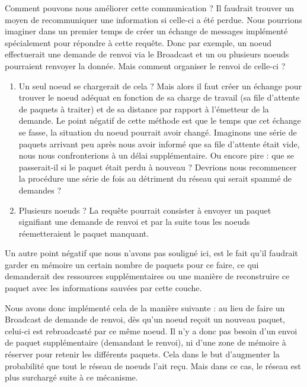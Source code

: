 \documentclass[journal, a4paper]{IEEEtran}
\begin{document}
        Comment pouvons nous améliorer cette communication ? Il faudrait trouver un moyen de recommuniquer une information si celle-ci a été perdue.
        Nous pourrions imaginer dans un premier temps de créer un échange de messages implémenté spécialement pour répondre à cette requête. Donc par exemple, un noeud 
        effectuerait une demande de renvoi via le Broadcast et un ou plusieurs noeuds pourraient renvoyer la donnée. Mais comment organiser le renvoi de celle-ci ?
        \begin{enumerate}
                \item Un seul noeud se chargerait de cela ? Mais alors il faut créer un échange pour trouver le noeud adéquat en fonction de sa charge de travail (sa file d'attente de paquets à 
                traiter) et de sa distance par rapport à l'émetteur de la demande. Le point négatif de cette méthode est que le temps que cet échange se fasse, la situation du noeud pourrait avoir changé. Imaginons
                une série de paquets arrivant peu après nous avoir informé que sa file d'attente était vide, nous nous confronterions à un délai supplémentaire. Ou encore pire : que se passerait-il si le 
                paquet était perdu à nouveau ? Devrions nous recommencer la procédure une série de fois au détriment du réseau qui serait spammé de demandes ?
                \item Plusieurs noeuds ? La requête pourrait consister à envoyer un paquet signifiant une demande de renvoi et par la suite tous les noeuds réemetteraient le paquet manquant.\\
        \end{enumerate}

        Un autre point négatif que nous n'avons pas souligné ici, est le fait qu'il faudrait garder en mémoire un certain nombre de paquets pour ce faire, ce qui demanderait des ressources supplémentaires
        ou une manière de reconstruire ce paquet avec les informations sauvées par cette couche.

        Nous avons donc implémenté cela de la manière suivante : au lieu de faire un Broadcast de demande de renvoi, dès qu'un noeud reçoit un nouveau paquet, celui-ci est rebroadcasté par ce 
        même noeud. Il n'y a donc pas besoin d'un envoi de paquet supplémentaire (demandant le renvoi), ni d'une zone de mémoire à réserver pour retenir les différents paquets.
        Cela dans le but d'augmenter la probabilité que tout le réseau de noeuds l'ait reçu. Mais dans ce cas, le réseau est plus surchargé suite à ce mécanisme. \\
\end{document}
